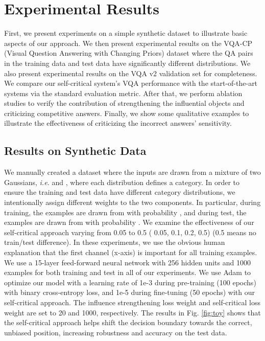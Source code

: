 \documentclass{article}
\begin{document}
\section{Experimental Results}
First, we present experiments on a simple synthetic dataset to illustrate basic aspects of our approach. We then present experimental results on the VQA-CP (Visual Question Answering with Changing Priors) \cite{vqa-cp} dataset where the QA pairs in the training data and test data have significantly different distributions. We also present experimental results on the VQA v2 validation set for completeness. We compare our self-critical system's VQA performance with the start-of-the-art systems via the standard evaluation metric. After that, we perform ablation studies to verify the contribution of strengthening the influential objects and criticizing competitive answers. Finally, we show some qualitative examples to illustrate the effectiveness of criticizing the incorrect answers' sensitivity.


\subsection{Results on Synthetic Data}
We manually created a dataset where the inputs are drawn from a mixture of two Gaussians, \textit{i.e.}  and , where each distribution defines a category. In order to ensure the training and test data have  different category distributions, we intentionally assign different weights to the two components. In particular, during training, the examples are drawn from  with probability , and during test, the examples are drawn from  with probability . We examine the effectiveness of our self-critical approach varying  from 0.05 to 0.5 ( 0.05, 0.1, 0.2, 0.5) (0.5 means no train/test difference). In these experiments, we use the obvious human explanation that the first channel (x-axis) is important for all training examples. We use a 15-layer feed-forward neural network with 256 hidden units and 1000 examples for both training and test in all of our experiments. We use Adam to optimize our model with a learning rate of 1e-3 during pre-training (100 epochs) with binary cross-entropy loss, and 1e-5 during fine-tuning (50 epochs) with our self-critical approach. The influence strengthening loss weight and self-critical loss weight are set to 20 and 1000, respectively. The results in Fig. \ref{fig:toy} shows that the self-critical approach helps shift the decision boundary towards the correct, unbiased position, increasing robustness and accuracy on the test data.
\end{document}
